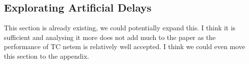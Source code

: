 \documentclass{article}
\begin{document}




 



\subsection{Explorating Artificial Delays}

This section is already existing, we could potentially expand this. I think it is sufficient and analysing it more does not add much to the paper as the performance of TC netem is relatively well accepted. I think we could even move this section to the appendix.

%
%
%
\end{document}
